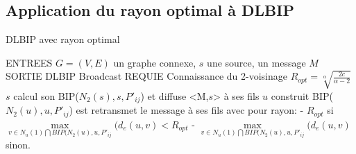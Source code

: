 \subsection{Application du rayon optimal à DLBIP}
\begin{algorithm}[h]
\caption{DLBIP avec rayon optimal}
\label{algo_DLBIP}
\begin{algorithmic}
\STATE ENTREES  $G=(V,E)$ un graphe connexe, $s$ une source, un message $M$
\STATE SORTIE  DLBIP Broadcast
\STATE REQUIE  Connaissance du 2-voisinage
\STATE $R_{opt}=\sqrt[\alpha]{\frac{2c}{\alpha-2}}$
\STATE $s$ calcul son BIP($N_2(s),s,P'_{ij}$) et diffuse <M,$s$> à ses fils
		\STATE $u$ construit BIP($N_2(u),u,P'_{ij}$) est retransmet le message à ses fils avec pour rayon:
			  \STATE - $R_{opt}$ si $\max\limits_{v\in N_u(1)\bigcap BIP(N_2(u),u,P'_{ij}}(d_e(u,v)< R_{opt}$
			  \STATE - $\max\limits_{v\in N_u(1)\bigcap BIP(N_2(u),u,P'_{ij}}(d_e(u,v)$ sinon.
			  
	\ENDIF
\ENDIF
\end{algorithmic}
\end{algorithm}










